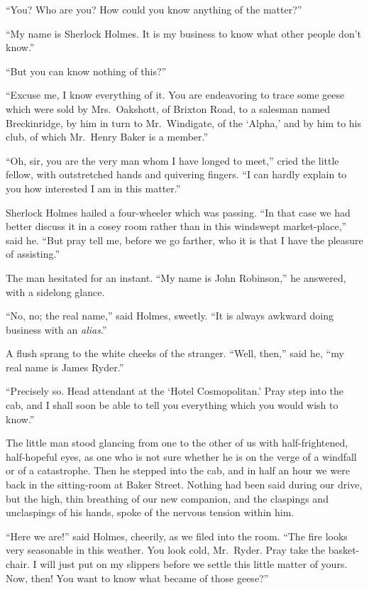 “You? Who are you? How could you know anything of
the matter?”

“My name is Sherlock Holmes. It is my business to know
what other people don’t know.”

“But you can know nothing of this?”

“Excuse me, I know everything of it. You are endeavoring
to trace some geese which were sold by Mrs.~Oakshott, of
Brixton Road, to a salesman named Breckinridge, by him in
turn to Mr.~Windigate, of the ‘Alpha,’ and by him to his club,
of which Mr.~Henry Baker is a member.”

“Oh, sir, you are the very man whom I have longed to
meet,” cried the little fellow, with outstretched hands and
quivering fingers. “I can hardly explain to you how interested
I am in this matter.”

Sherlock Holmes hailed a four-wheeler which was passing.
“In that case we had better discuss it in a cosey room rather
than in this windswept market-place,” said he. “But pray
tell me, before we go farther, who it is that I have the pleasure
of assisting.”

The man hesitated for an instant. “My name is John
Robinson,” he answered, with a sidelong glance.

“No, no; the real name,” said Holmes, sweetly. “It is
always awkward doing business with an \textit{alias}.”

A flush sprang to the white cheeks of the stranger. “Well,
then,” said he, “my real name is James Ryder.”

“Precisely so. Head attendant at the ‘Hotel Cosmopolitan.’
Pray step into the cab, and I shall soon be able to tell you
everything which you would wish to know.”

The little man stood glancing from one to the other of us
with half-frightened, half-hopeful eyes, as one who is not sure
whether he is on the verge of a windfall or of a catastrophe.
Then he stepped into the cab, and in half an hour we were
back in the sitting-room at Baker Street. Nothing had been
said during our drive, but the high, thin breathing of our new
companion, and the claspings and unclaspings of his hands,
spoke of the nervous tension within him.

“Here we are!” said Holmes, cheerily, as we filed into the
room. “The fire looks very seasonable in this weather. You
look cold, Mr.~Ryder. Pray take the basket-chair. I will just
put on my slippers before we settle this little matter of yours.
Now, then! You want to know what became of those
geese?”

